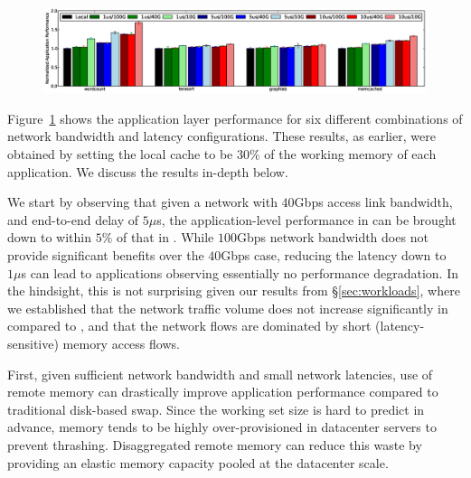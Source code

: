 %
\begin{figure}
  \centering
    \includegraphics[width = 7in]{img/graph8_vary_latency_bw.eps} 
  \caption{\small{}}
  \label{fig:latb}
\end{figure}
%
Figure~\ref{fig:latb} shows the application layer performance for six different combinations of network bandwidth and latency configurations. These results, as earlier, were obtained by setting the local cache to be $30\%$ of the working memory of each application. We discuss the results in-depth below. 

We start by observing that given a network with $40$Gbps access link bandwidth, and end-to-end delay of $5\mu$s, the application-level performance in \dis can be brought down to within $5\%$ of that in \pdis. While $100$Gbps network bandwidth does not provide significant benefits over the $40$Gbps case, reducing the latency down to $1\mu$s can lead to applications observing essentially no performance degradation. In the hindsight, this is not surprising given our results from \S\ref{sec:workloads}, where we established that the network traffic volume does not increase significantly in \dis compared to \pdis, and that the network flows are dominated by short (latency-sensitive) memory access flows. 

First, given sufficient network bandwidth and small network latencies, use of remote memory can drastically improve application performance compared to traditional disk-based swap. Since the working set size is hard to predict in advance, memory tends to be highly over-provisioned in datacenter servers to prevent thrashing. Disaggregated remote memory can reduce this waste by providing an elastic memory capacity pooled at the datacenter scale. 


